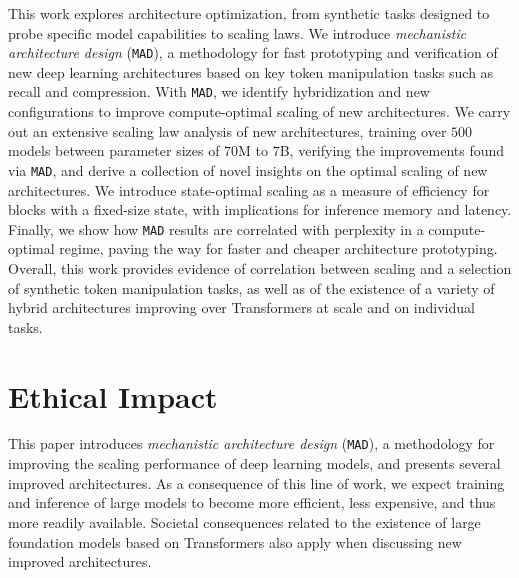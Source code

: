 This work explores architecture optimization, from synthetic tasks designed to probe specific model capabilities to scaling laws. We introduce \textit{mechanistic architecture design} ({\tt MAD}), a methodology for fast prototyping and verification of new deep learning architectures based on key token manipulation tasks such as recall and compression. With {\tt MAD}, we identify hybridization and new configurations to improve compute-optimal scaling of new architectures. We carry out an extensive scaling law analysis of new architectures, training over $500$ models between parameter sizes of $70$M to $7$B, verifying the improvements found via {\tt MAD}, and derive a collection of novel insights on the optimal scaling of new architectures. We introduce state-optimal scaling as a measure of efficiency for blocks with a fixed-size state, with implications for inference memory and latency. Finally, we show how {\tt MAD} results are correlated with perplexity in a compute-optimal regime, paving the way for faster and cheaper architecture prototyping. Overall, this work provides evidence of correlation between scaling and a selection of synthetic token manipulation tasks, as well as of the existence of a variety of hybrid architectures improving over Transformers at scale and on individual tasks.

\section{Ethical Impact}

This paper introduces \textit{mechanistic architecture design} ({\tt MAD}), a methodology for improving the scaling performance of deep learning models, and presents several improved architectures. As a consequence of this line of work, we expect training and inference of large models to become more efficient, less expensive, and thus more readily available. Societal consequences related to the existence of large foundation models based on Transformers also apply when discussing new improved architectures.


